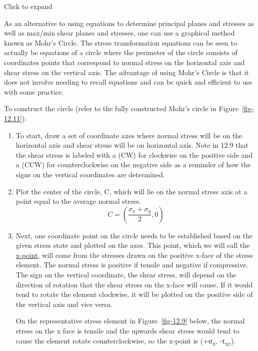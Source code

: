 \documentclass[
  letterpaper,
  DIV=11,
  numbers=noendperiod]{scrreprt}
\theoremstyle{definition}
\theoremstyle{remark}
\begin{document}
Click to expand

As an alternative to using equations to determine principal planes and
stresses as well as max/min shear planes and stresses, one can use a
graphical method known as Mohr's Circle. The stress transformation
equations can be seen to actually be equations of a circle where the
perimeter of the circle consists of coordinates points that correspond
to normal stress on the horizontal axis and shear stress on the vertical
axis. The advantage of using Mohr's Circle is that it does not involve
needing to recall equations and can be quick and efficient to use with
some practice.

To construct the circle (refer to the fully constructed Mohr's circle in
Figure~\ref{fig-12.11}):

\begin{enumerate}
\def\labelenumi{\arabic{enumi}.}
\item
  To start, draw a set of coordinate axes where normal stress will be on
  the horizontal axis and shear stress will be on horizontal axis. Note
  in 12.9 that the shear stress is labeled with a (CW) for clockwise on
  the positive side and a (CCW) for counterclockwise on the negative
  side as a reminder of how the signs on the vertical coordinates are
  determined.
\item
  Plot the center of the circle, C, which will lie on the normal stress
  axis at a point equal to the average normal stress.\\
  \[
  C=\left(\frac{\sigma_x+\sigma_y}{2}, 0\right)
  \]
\item
  Next, one coordinate point on the circle needs to be established based
  on the given stress state and plotted on the axes. This point, which
  we will call the \ul{x-point,} will come from the stresses drawn on
  the positive x-face of the stress element. The normal stress is
  positive if tensile and negative if compressive. The sign on the
  vertical coordinate, the shear stress, will depend on the direction of
  rotation that the shear stress on the x-face will cause. If it would
  tend to rotate the element clockwise, it will be plotted on the
  positive side of the vertical axis and vice versa.

  On the representative stress element in Figure~\ref{fig-12.9} below,
  the normal stress on the x face is tensile and the upwards shear
  stress would tend to cause the element rotate counterclockwise, so the
  x-point is (+σ\textsubscript{x}, -τ\textsubscript{xy}).
\end{enumerate}
\end{document}
